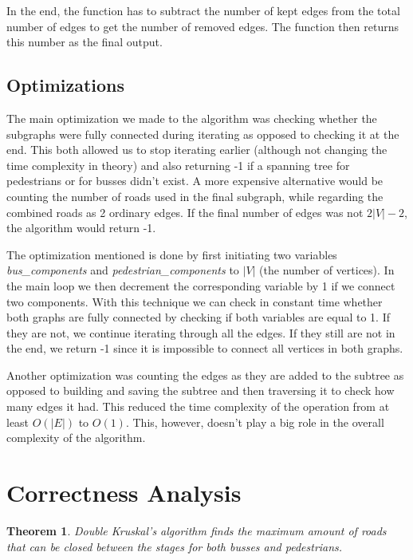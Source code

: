 \documentclass[a4paper]{article}
\newtheorem{theorem}{Theorem}
\begin{document}
In the end, the function has to subtract the number of kept edges from the total number of edges to get the number of removed edges. The function then returns this number as the final output.

\subsection{Optimizations}
The main optimization we made to the algorithm was checking whether the subgraphs were fully connected during iterating as opposed to checking it at the end. This both allowed us to stop iterating earlier (although not changing the time complexity in theory) and also returning -1 if a spanning tree for pedestrians or for busses didn't exist. A more expensive alternative would be counting the number of roads used in the final subgraph, while regarding the combined roads as 2 ordinary edges. If the final number of edges was not $2|V| - 2$, the algorithm would return -1.

The optimization mentioned is done by first initiating two variables \textsl{bus\_components} and \textsl{pedestrian\_components} to $|V|$ (the number of vertices). In the main loop we then decrement the corresponding variable by 1 if we connect two components. With this technique we can check in constant time whether both graphs are fully connected by checking if both variables are equal to 1. If they are not, we continue iterating through all the edges. If they still are not in the end, we return -1 since it is impossible to connect all vertices in both graphs.

Another optimization was counting the edges as they are added to the subtree as opposed to building and saving the subtree and then traversing it to check how many edges it had. This reduced the time complexity of the operation from at least $O(|E|)$ to $O(1)$. This, however, doesn't play a big role in the overall complexity of the algorithm.

\section{Correctness Analysis}
\begin{theorem}
    Double Kruskal's algorithm finds the maximum amount of roads that can be closed between the stages for both busses and pedestrians.
\end{theorem}
\end{document}
